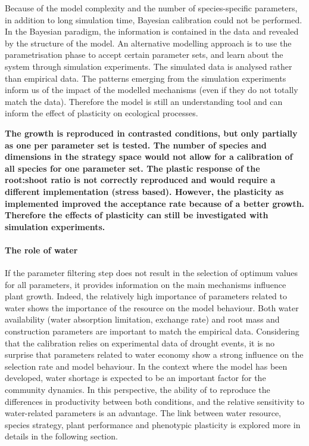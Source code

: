 Because of the model complexity and the number of species-specific parameters, in addition to long simulation time, Bayesian calibration could not be performed. In the Bayesian paradigm, the information is contained in the data and revealed by the structure of the model. An alternative modelling approach is to use the parametrisation phase to accept certain parameter sets, and learn about the system through simulation experiments. The simulated data is analysed rather than empirical data. The patterns emerging from the simulation experiments inform us of the impact of the modelled mechanisms (even if they do not totally match the data). Therefore the model is still an understanding tool and can inform the effect of plasticity on ecological processes.


\textbf{The growth is reproduced in contrasted conditions, but only partially as one per parameter set is tested. The number of species and dimensions in the strategy space would not allow for a calibration of all species for one parameter set. The plastic response of the root:shoot ratio is not correctly reproduced and would require a different implementation (stress based). However, the plasticity as implemented improved the acceptance rate because of a better growth. Therefore the effects of plasticity can still be investigated with simulation experiments.}

\paragraph{The role of water}

If the parameter filtering step does not result in the selection of optimum values for all parameters, it provides information on the main mechanisms influence plant growth. Indeed, the relatively high importance of parameters related to water shows the importance of the resource on the model behaviour. Both water availability (water absorption limitation, exchange rate) and root mass and construction parameters are important to match the empirical data. Considering that the calibration relies on experimental data of drought events, it is no surprise that parameters related to water economy show a strong influence on the selection rate and model behaviour. In the context where the model has been developed, water shortage is expected to be an important factor for the community dynamics. In this perspective, the ability of \model to reproduce the differences in productivity between both conditions, and the relative sensitivity to water-related parameters is an advantage. The link between water resource, species strategy, plant performance and phenotypic plasticity is explored more in details in the following section.


